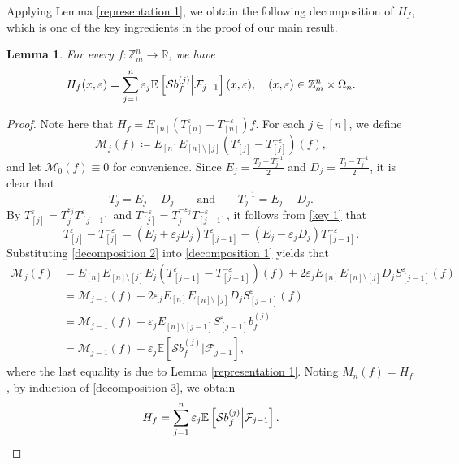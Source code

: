 \documentclass{amsart}
\numberwithin{equation}{section}
\newtheorem{lem}[thm]{Lemma}
\newcommand{\Z}{{\mathbb{Z}^{n}_{m}}}
\begin{document}
Applying Lemma \ref{representation 1}, we obtain the following decomposition of $H_{f}$, which is one of the key ingredients in the proof of our main result.
\begin{lem}\label{main decomposition}
For every $f:\Z\to \mathbb{R}$, we have
\begin{equation}\label{decomposition of Hf}
H_{f}(x,\varepsilon)=\sum_{j=1}^{n}\varepsilon_{j}\mathbb{E}\left[\mathcal{S}b^{(j)}_{f}\Big{|}\mathcal{F}_{j-1}\right](x,\varepsilon), \quad (x,\varepsilon)\in \Z\times \Omega_{n}.
\end{equation}
\end{lem}
\begin{proof}
Note here that $H_{f}=E_{[n]}\left(T^{\varepsilon}_{[n]}-T^{-\varepsilon}_{[n]}\right)f$. For each $j\in [n]$, we define
\begin{equation}\label{decomposition 1}
\mathcal{M}_{j}(f)\coloneqq E_{[n]}E_{[n]\setminus[j]}\left(T^{\varepsilon}_{[j]}-T^{-\varepsilon}_{[j]}\right)(f),
\end{equation}
and let $\mathcal{M}_{0}(f)\equiv 0$ for convenience. Since $E_{j}=\frac{T_{j}+T^{-1}_{j}}{2}$ and $D_{j}=\frac{T_{j}-T^{-1}_{j}}{2}$, it is clear that
\begin{equation}\label{key 1}
T_{j}=E_{j}+D_{j}\qquad\mbox{and}\qquad T^{-1}_{j}=E_{j}-D_{j}.
\end{equation}
By $T^{\varepsilon}_{[j]}=T^{\varepsilon_{j}}_{j}T^{\varepsilon}_{[j-1]}$ and $T^{-\varepsilon}_{[j]}=T^{-\varepsilon_{j}}_{j}T^{-\varepsilon}_{[j-1]}$, it follows from \eqref{key 1} that
\begin{equation}\label{decomposition 2}
T^{\varepsilon}_{[j]}-T^{-\varepsilon}_{[j]}=(E_{j}+\varepsilon_{j}D_{j})T^{\varepsilon}_{[j-1]}-(E_{j}-\varepsilon_{j}D_{j})T^{-\varepsilon}_{[j-1]}.
\end{equation}
Substituting \eqref{decomposition 2} into \eqref{decomposition 1} yields that
\begin{equation}\label{decomposition 3}
\begin{split}
\mathcal{M}_{j}(f)&=E_{[n]}E_{[n]\setminus[j]}E_{j}\left(T^{\varepsilon}_{[j-1]}-T^{-\varepsilon}_{[j-1]}\right)(f)+2\varepsilon_{j}E_{[n]}E_{[n]\setminus[j]}D_{j}S^{\varepsilon}_{[j-1]}(f)\\
&=\mathcal{M}_{j-1}(f)+2\varepsilon_{j}E_{[n]}E_{[n]\setminus[j]}D_{j}S^{\varepsilon}_{[j-1]}(f)\\
&=\mathcal{M}_{j-1}(f)+\varepsilon_{j}E_{[n]\setminus[j-1]}S^{\varepsilon}_{[j-1]}b^{(j)}_{f}\\
&=\mathcal{M}_{j-1}(f)+\varepsilon_{j}\mathbb{E}\left[\mathcal{S}b^{(j)}_{f}|\mathcal{F}_{j-1}\right],
\end{split}
\end{equation}
where the last equality is due to Lemma  \ref{representation 1}. Noting $M_{n}(f)=H_{f}$,  by induction of \eqref{decomposition 3},  we obtain
\[
H_{f}=\sum_{j=1}^{n}\varepsilon_{j} \mathbb{E}\left[\mathcal{S}b^{(j)}_{f}\Big{|}\mathcal{F}_{j-1}\right].
\]
\end{proof}
\end{document}
